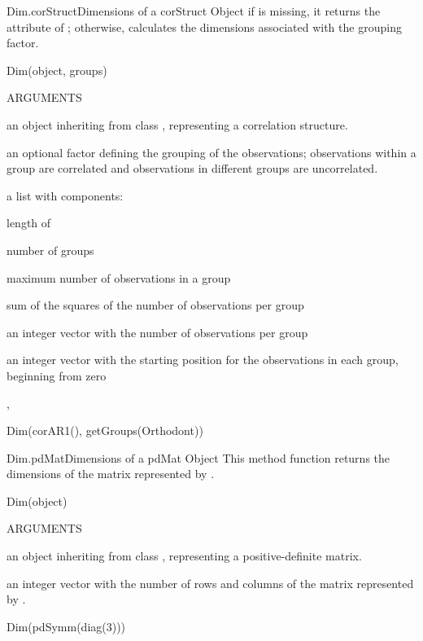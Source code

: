 \documentclass[pdftex]{article} \usepackage{url,graphicx}
\begin{document}
\begin{Helpfile}{Dim.corStruct}{Dimensions of a corStruct Object}
if  is missing, it returns the  attribute of
; otherwise, calculates the dimensions associated with
the grouping factor.
\begin{Example}
Dim(object, groups)
\end{Example}
\begin{Argument}{ARGUMENTS}
\item[\Co{object:}]
an object inheriting from class ,
representing a correlation structure.
\item[\Co{groups:}]
an optional factor defining the grouping of the
observations; observations within a group are correlated and
observations in different groups are uncorrelated.
\end{Argument}
a list with components:
\begin{Argument}{}
\vspace{-16pt} 
\item[\Co{N:}]
length of 
\item[\Co{M:}]
number of groups
\item[\Co{maxLen:}]
maximum number of observations in a group
\item[\Co{sumLenSq:}]
sum of the squares of the number of observations per
group
\item[\Co{len:}]
an integer vector with the number of observations per
group
\item[\Co{start:}]
an integer vector with the starting position for the
observations in each group, beginning from zero
\end{Argument}
, 
\need 15pt
\vspace{-16pt} 
\begin{Example}
Dim(corAR1(), getGroups(Orthodont))
\end{Example}
\end{Helpfile}
\begin{Helpfile}{Dim.pdMat}{Dimensions of a pdMat Object}
This method function returns the dimensions of the matrix represented
by .
\begin{Example}
Dim(object)
\end{Example}
\begin{Argument}{ARGUMENTS}
\item[\Co{object:}]
an object inheriting from class ,
representing a positive-definite matrix.
\end{Argument}
an integer vector with the number of rows and columns of the
matrix represented by .
\need 15pt
\vspace{-16pt} 
\begin{Example}
Dim(pdSymm(diag(3)))
\end{Example}
\end{Helpfile}
\end{document}
